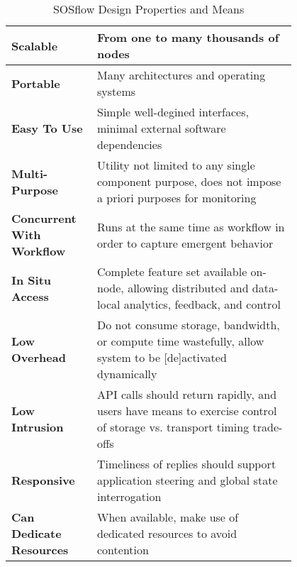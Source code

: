 

\begin{table*}[t]
\renewcommand{\arraystretch}{1.3}
\caption{SOSflow Design Properties and Means}
\label{tabledesign}
\centering
\begin{tabular}{|p{0.2\linewidth}|p{0.6\linewidth}|}
\hline %
%
\textbf{Scalable}
&
From one to many thousands of nodes
\\
%
%
\hline %
%
\textbf{Portable}
&
Many architectures and operating systems
\\
%
%
\hline %
%
\textbf{Easy To Use}
& 
Simple well-degined interfaces, minimal external software dependencies
\\
%
%
\hline %
%
\textbf{Multi-Purpose}
&
Utility not limited to any single component purpose, does not impose
a priori purposes for monitoring
\\
%
%
\hline %
%
\textbf{Concurrent With Workflow}
&
Runs at the same time as workflow in order to capture emergent
behavior
\\
%
%
\hline %
%
\textbf{In Situ Access}
&
Complete feature set available on-node, allowing distributed and
data-local analytics, feedback, and control
\\
%
%
\hline %
%
\textbf{Low Overhead}
&
Do not consume storage, bandwidth, or compute time wastefully, allow
system to be [de]activated dynamically
\\
%
%
\hline %
%
\textbf{Low Intrusion}
&
API calls should return rapidly, and users have means to exercise
control of storage vs. transport timing trade-offs
\\
%
%
\hline %
%
\textbf{Responsive}
&
Timeliness of replies should support application steering and global
state interrogation
\\
%
%
\hline %
%
\textbf{Can Dedicate Resources}
&
When available, make use of dedicated resources to avoid contention
\\


\end{tabular}
\end{table*}
